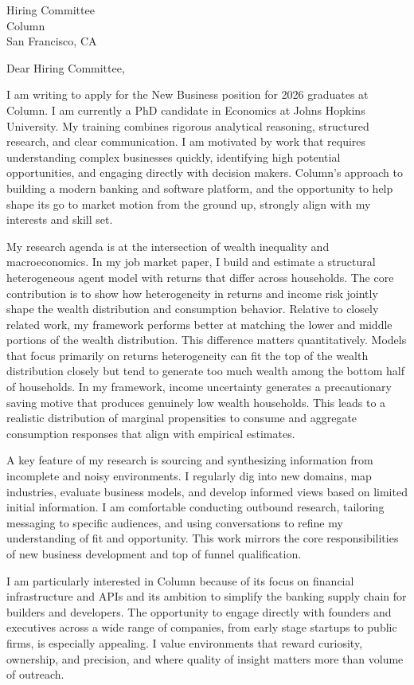\documentclass[11pt]{letter}
\begin{document}
\begin{letter}{Hiring Committee \\ Column \\ San Francisco, CA}

\opening{Dear Hiring Committee,}

I am writing to apply for the New Business position for 2026 graduates at Column. I am currently a PhD candidate in Economics at Johns Hopkins University. My training combines rigorous analytical reasoning, structured research, and clear communication. I am motivated by work that requires understanding complex businesses quickly, identifying high potential opportunities, and engaging directly with decision makers. Column’s approach to building a modern banking and software platform, and the opportunity to help shape its go to market motion from the ground up, strongly align with my interests and skill set.

My research agenda is at the intersection of wealth inequality and macroeconomics. In my job market paper, I build and estimate a structural heterogeneous agent model with returns that differ across households. The core contribution is to show how heterogeneity in returns and income risk jointly shape the wealth distribution and consumption behavior. Relative to closely related work, my framework performs better at matching the lower and middle portions of the wealth distribution. This difference matters quantitatively. Models that focus primarily on returns heterogeneity can fit the top of the wealth distribution closely but tend to generate too much wealth among the bottom half of households. In my framework, income uncertainty generates a precautionary saving motive that produces genuinely low wealth households. This leads to a realistic distribution of marginal propensities to consume and aggregate consumption responses that align with empirical estimates.

A key feature of my research is sourcing and synthesizing information from incomplete and noisy environments. I regularly dig into new domains, map industries, evaluate business models, and develop informed views based on limited initial information. I am comfortable conducting outbound research, tailoring messaging to specific audiences, and using conversations to refine my understanding of fit and opportunity. This work mirrors the core responsibilities of new business development and top of funnel qualification.

I am particularly interested in Column because of its focus on financial infrastructure and APIs and its ambition to simplify the banking supply chain for builders and developers. The opportunity to engage directly with founders and executives across a wide range of companies, from early stage startups to public firms, is especially appealing. I value environments that reward curiosity, ownership, and precision, and where quality of insight matters more than volume of outreach.


\end{letter}
\end{document}
